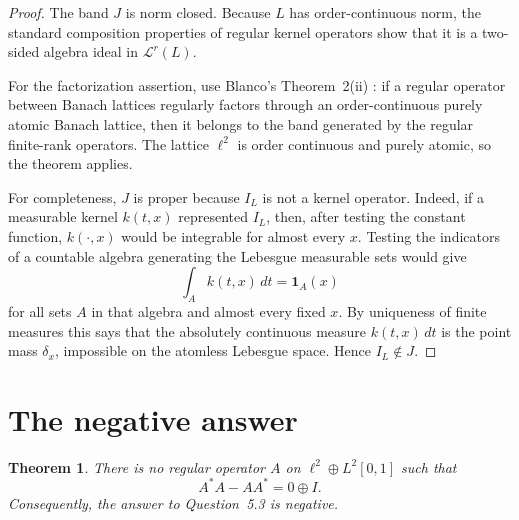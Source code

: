 \documentclass[11pt]{article}
\newcommand{\Lr}{\mathcal L^r}
\newcommand{\ellTwo}{\ell^2}
\newtheorem{theorem}{Theorem}
\begin{document}
\begin{proof}
The band $J$ is norm closed.  Because $L$ has order-continuous norm, the
standard composition properties of regular kernel operators show that it is
a two-sided algebra ideal in $\Lr(L)$.

For the factorization assertion, use Blanco's Theorem~2(ii) \cite{Blanco}:
if a regular operator between Banach lattices regularly factors through an
order-continuous purely atomic Banach lattice, then it belongs to the band
generated by the regular finite-rank operators.  The lattice $\ellTwo$ is
order continuous and purely atomic, so the theorem applies.

For completeness, $J$ is proper because $I_L$ is not a kernel operator.
Indeed, if a measurable kernel $k(t,x)$ represented $I_L$, then, after
testing the constant function, $k(\mathord\cdot,x)$ would be integrable for
almost every $x$.  Testing the indicators of a countable algebra generating
the Lebesgue measurable sets would give
\[
 \int_A k(t,x)\,dt=\mathbf 1_A(x)
\]
for all sets $A$ in that algebra and almost every fixed $x$.  By uniqueness
of finite measures this says that the absolutely continuous measure
$k(t,x)\,dt$ is the point mass $\delta_x$, impossible on the atomless
Lebesgue space.  Hence $I_L\notin J$.
\end{proof}

\section{The negative answer}

\begin{theorem}\label{thm:main}
There is no regular operator $A$ on $\ellTwo\oplus L^2[0,1]$ such that
\[
 A^*A-AA^*=0\oplus I.
\]
Consequently, the answer to Question~5.3 is negative.
\end{theorem}
\end{document}
